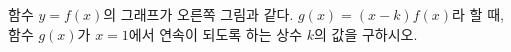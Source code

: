 \noindent\begin{minipage}[t]{0.58\linewidth}\vspace{0pt}\raggedright 함수 $y=f(x)$의 그래프가 오른쪽 그림과 같다. $g(x)=(x-k)f(x)$라 할 때, 함수 $g(x)$가 $x=1$에서 연속이 되도록 하는 상수 $k$의 값을 구하시오.\end{minipage}\hfill\begin{minipage}[t]{0.4\linewidth}\vspace{0pt}\centering \resizebox{\ifdim\width>\linewidth\linewidth\else\width\fi}{!}{}\end{minipage}\par
